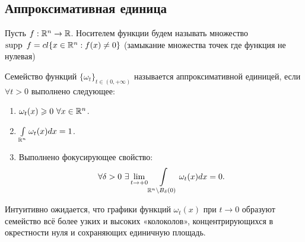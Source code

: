 \subsection{Аппроксимативная единица}
\begin{definition}
    Пусть $f: \mathbb{R}^n \rightarrow \mathbb{R}$. Носителем функции будем называть множество $\operatorname{supp} \ f = cl{\{x \in \mathbb{R}^n : f(x) \neq 0 \}}$ (замыкание множества точек где функция не нулевая)
\end{definition}

\begin{definition}
    Семейство функций $\{\omega_t\}_{t \in (0, +\infty)}$ называется аппроксимативной единицей, если $\forall t > 0$ выполнено следующее:
    \begin{enumerate}
        \item $\omega_t(x) \geqslant 0 \ \forall x \in \mathbb{R}^n$.
        \item $\int\limits_{\mathbb{R}^n} \omega_t(x) dx = 1$.
        \item Выполнено фокусирующее свойство: \[\forall \delta > 0  \ \exists \lim\limits_{t \rightarrow +0} \int\limits_{\mathbb{R}^n \setminus B_\delta(0)} \omega_{t}(x)dx = 0.\]
    \end{enumerate}
\end{definition}
Интуитивно ожидается, что графики функций \(\omega_t(x)\) при \(t \to 0\) образуют семейство всё более узких и высоких «колоколов», концентрирующихся в окрестности нуля и сохраняющих единичную площадь.
\begin{center}
\end{center}




